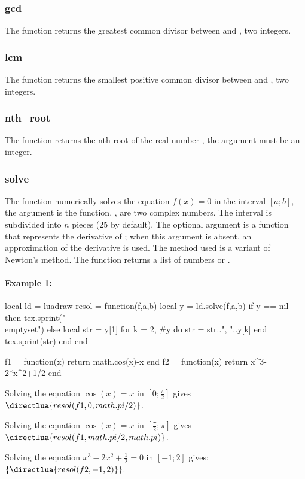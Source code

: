 \subsubsection{gcd}
The function  returns the greatest common divisor between  and , two integers.

\subsubsection{lcm}
The function  returns the smallest positive common divisor between  and , two integers.

\subsubsection{nth\_root}
The function  returns the nth root of the real number , the argument  must be an integer.

\subsubsection{solve}
The function  numerically solves the equation $f(x)=0$ in the interval $[a;b]$, the argument  is the function, ,  are two complex numbers. The interval is subdivided into $n$ pieces ($25$ by default). The optional argument  is a function that represents the derivative of ; when this argument is absent, an approximation of the derivative is used. The method used is a variant of Newton's method. The function returns a list of numbers or \nil.

\paragraph{Example 1:}
\begin{TeXcode}
\begin{luacode}
local ld = luadraw
resol = function(f,a,b) 
    local y = ld.solve(f,a,b) 
    if y == nil then tex.sprint("\\emptyset") 
    else 
        local str = y[1] 
        for k = 2, #y do 
            str = str..", "..y[k] 
        end 
        tex.sprint(str) 
    end
end
\end{luacode}
\def\solve#1#2#3{\directlua{resol(#1,#2,#3)}}%
\begin{luacode}
f1 = function(x) return math.cos(x)-x end
f2 = function(x) return x^3-2*x^2+1/2 end
\end{luacode}
Solving the equation $\cos(x)=x$ in $[0;\frac{\pi}2]$ gives $\solve{f1}{0}{math.pi/2}$.\par
Solving the equation $\cos(x)=x$ in $[\frac{\pi}2;\pi]$ gives $\solve{f1}{math.pi/2}{math.pi}$.\par
Solving the equation $x^3-2x^2+\frac12=0$ in $[-1;2]$ gives: $\{\solve{f2}{-1}{2}\}$.
\end{TeXcode}
